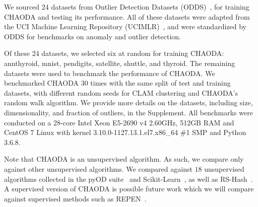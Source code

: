 We sourced 24 datasets from Outlier Detection Datasets (ODDS)~\cite{rayana2016odds}, for training CHAODA and testing its performance.
All of these datasets were adapted from the UCI Machine Learning Repository (UCIMLR)~\cite{UCIMLR}, and were standardized by ODDS for benchmarks on anomaly and outlier detection.

Of these 24 datasets, we selected six at random for training CHAODA: annthyroid, mnist, pendigits, satellite, shuttle, and thyroid.
The remaining datasets were used to benchmark the performance of CHAODA\@.
We benchmarked CHAODA 30 times with the same split of test and training datasets, with different random seeds for CLAM clustering and CHAODA's random walk algorithm.
We provide more details on the datasets, including size, dimensionality, and fraction of outliers, in the Supplement.
All benchmarks were conducted on a 28-core Intel Xeon E5-2690 v4 2.60GHz, 512GB RAM and CentOS 7 Linux with kernel 3.10.0-1127.13.1.el7.x86\_64 \#1 SMP and Python 3.6.8.

Note that CHAODA is an unsupervised algorithm.
As such, we compare only against other unsupervised algorithms.
We compared against $18$ unsupervised algorithms collected in the pyOD suite~\cite{zhao2019pyod} and Scikit-Learn~\cite{pedregosa2011scikit}, as well as RS-Hash~\cite{sathe2016subspace}.
A supervised version of CHAODA is possible future work which we will compare against supervised methods such as REPEN~\cite{pang2018learning}.